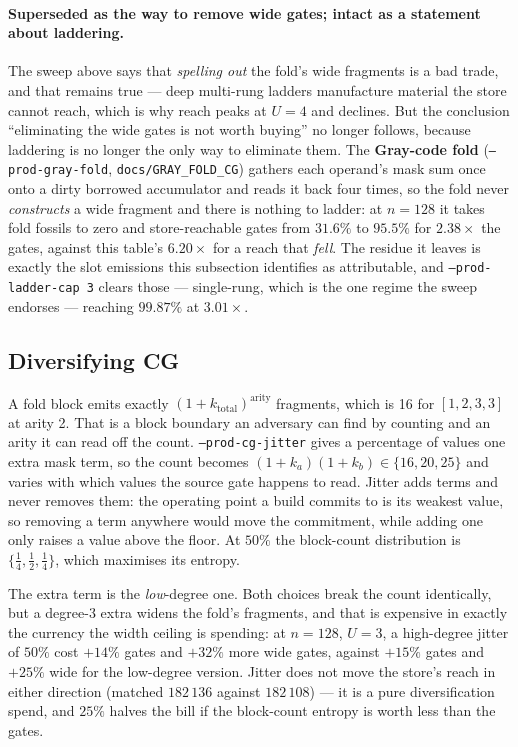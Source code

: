 \documentclass[11pt]{article}
\newcommand{\code}[1]{\texttt{#1}}
\begin{document}
\paragraph{Superseded as the way to remove wide gates; intact as a statement
about laddering.} The sweep above says that \emph{spelling out} the fold's wide
fragments is a bad trade, and that remains true --- deep multi-rung ladders
manufacture material the store cannot reach, which is why reach peaks at
$U{=}4$ and declines. But the conclusion ``eliminating the wide gates is not
worth buying'' no longer follows, because laddering is no longer the only way
to eliminate them. The \textbf{Gray-code fold} (\code{--prod-gray-fold},
\code{docs/GRAY\_FOLD\_CG}) gathers each operand's mask sum once onto a dirty
borrowed accumulator and reads it back four times, so the fold never
\emph{constructs} a wide fragment and there is nothing to ladder: at $n{=}128$
it takes fold fossils to zero and store-reachable gates from $31.6\%$ to
$95.5\%$ for $2.38\times$ the gates, against this table's $6.20\times$ for a
reach that \emph{fell}. The residue it leaves is exactly the slot emissions
this subsection identifies as attributable, and \code{--prod-ladder-cap 3}
clears those --- single-rung, which is the one regime the sweep endorses ---
reaching $99.87\%$ at $3.01\times$.

\subsection{Diversifying CG}

A fold block emits exactly $(1 + k_{\text{total}})^{\text{arity}}$ fragments,
which is 16 for $[1,2,3,3]$ at arity 2. That is a block boundary an adversary
can find by counting and an arity it can read off the count.
\code{--prod-cg-jitter} gives a percentage of values one extra mask
term, so the count becomes $(1 + k_a)(1 + k_b) \in \{16, 20, 25\}$ and varies
with which values the source gate happens to read. Jitter adds terms and never
removes them: the operating point a build commits to is its weakest value, so
removing a term anywhere would move the commitment, while adding one only raises
a value above the floor. At $50\%$ the block-count distribution is
$\{\tfrac14, \tfrac12, \tfrac14\}$, which maximises its entropy.

The extra term is the \emph{low}-degree one. Both choices break the count
identically, but a degree-3 extra widens the fold's fragments, and that is
expensive in exactly the currency the width ceiling is spending: at $n{=}128$,
$U{=}3$, a high-degree jitter of $50\%$ cost $+14\%$ gates and $+32\%$ more wide
gates, against $+15\%$ gates and $+25\%$ wide for the low-degree version. Jitter
does not move the store's reach in either direction (matched $182\,136$ against
$182\,108$) --- it is a pure diversification spend, and $25\%$ halves the bill
if the block-count entropy is worth less than the gates.
\end{document}
